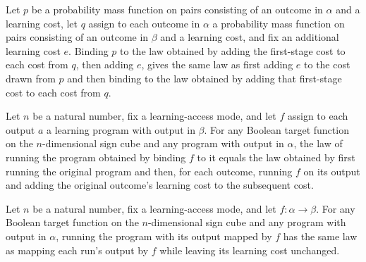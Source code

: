 \begin{theorem}
\label{FABL.LearningProgram.bind_map_addOutcomeCost_comm}
\leanok
{}
Let $p$ be a probability mass function on pairs consisting of an outcome in $\alpha$ and
a learning cost, let $q$ assign to each outcome in $\alpha$ a probability mass function
on pairs consisting of an outcome in $\beta$ and a learning cost, and fix an additional
learning cost $e$. Binding $p$ to the law obtained by adding the first-stage cost to
each cost from $q$, then adding $e$, gives the same law as first adding $e$ to the cost
drawn from $p$ and then binding to the law obtained by adding that first-stage cost to
each cost from $q$.
\end{theorem}

\begin{theorem}
\label{FABL.LearningProgram.runWithCost_bind}
\leanok
{}
Let $n$ be a natural number, fix a learning-access mode, and let $f$ assign to each
output $a$ a learning program with output in $\beta$. For any Boolean target function on
the $n$-dimensional sign cube and any program with output in $\alpha$, the law of
running the program obtained by binding $f$ to it equals the law obtained by first
running the original program and then, for each outcome, running $f$ on its output and
adding the original outcome's learning cost to the subsequent cost.
\end{theorem}

\begin{theorem}
\label{FABL.LearningProgram.runWithCost_map}
\leanok
{}
Let $n$ be a natural number, fix a learning-access mode, and let
$f\colon\alpha\to\beta$. For any Boolean target function on the $n$-dimensional sign
cube and any program with output in $\alpha$, running the program with its output mapped
by $f$ has the same law as mapping each run's output by $f$ while leaving its learning
cost unchanged.
\end{theorem}

